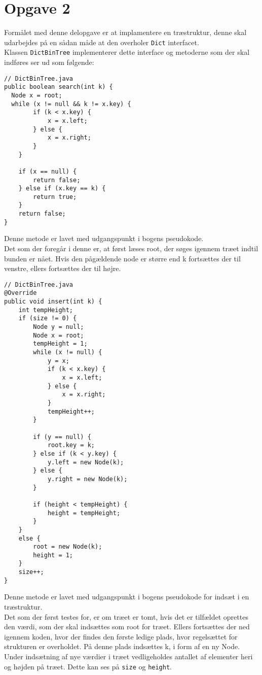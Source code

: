 \documentclass{article}
\begin{document}
\section*{Opgave 2}
Formålet med denne delopgave er at implamentere en træstruktur, denne skal udarbejdes på en sådan måde at den overholer \texttt{Dict} interfacet.\\
Klassen \texttt{DictBinTree} implementerer dette interface og metoderne som der skal indføres ser ud som følgende:
\begin{lstlisting}
// DictBinTree.java
public boolean search(int k) {
  Node x = root;
  while (x != null && k != x.key) {
        if (k < x.key) {
            x = x.left;
        } else {
            x = x.right;
        }
    }

    if (x == null) {
        return false;
    } else if (x.key == k) {
        return true;
    }
    return false;
}
\end{lstlisting}
\bigskip
Denne metode er lavet med udgangspunkt i bogens pseudokode.\\
Det som der foregår i denne er, at først læses root, der søges igennem træet indtil bunden er nået. Hvis den pågældende node er større end k fortsættes der til venstre, ellers fortsættes der til højre.\\
\newpage
\begin{lstlisting}
// DictBinTree.java
@Override
public void insert(int k) {
	int tempHeight;
	if (size != 0) {
		Node y = null;
       	Node x = root;
		tempHeight = 1;
		while (x != null) {
			y = x;
			if (k < x.key) {
				x = x.left;
			} else {
				x = x.right;
			}
			tempHeight++;
        }
		
		if (y == null) {
			root.key = k;
		} else if (k < y.key) {
			y.left = new Node(k);
		} else {
			y.right = new Node(k);
		}
            
		if (height < tempHeight) {
			height = tempHeight;
		}
	}
	else {
		root = new Node(k);
		height = 1;
	}
	size++;
}
\end{lstlisting}
\bigskip
Denne metode er lavet med udgangspunkt i bogens pseudokode for indsæt i en træstruktur.\\
Det som der først testes for, er om træet er tomt, hvis det er tilfældet oprettes den værdi, som der skal indsættes som root for træet. Ellers fortsættes der ned igennem koden, hvor der findes den første ledige plads, hvor regelsættet for strukturen er overholdet. På denne plads indsættes k, i form af en ny Node.\\
Under indsætning af nye værdier i træet vedligeholdes antallet af elementer heri og højden på træet. Dette kan ses på \texttt{size} og \texttt{height}.
\end{document}
